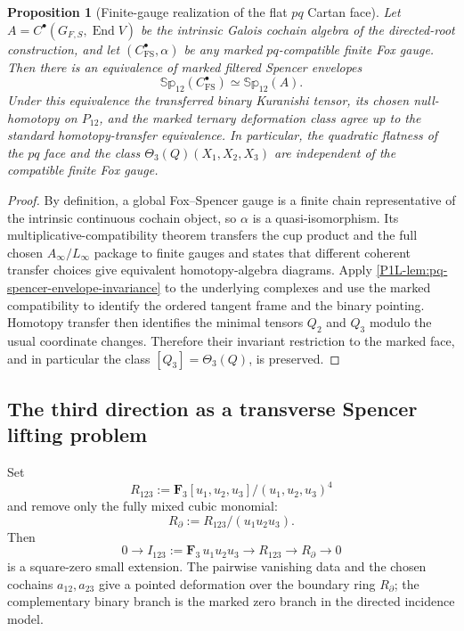 \documentclass[11pt]{article}
\newtheorem{proposition}[theorem]{Proposition}
\theoremstyle{remark}
\newcommand{\F}{\mathbf F}
\begin{document}
\begin{proposition}[Finite-gauge realization of the flat $pq$ Cartan face]
\label{P1L-thm:pq-finite-gauge-comparison}
Let $A=C^\bullet(G_{F,S},\operatorname{End}V)$ be the intrinsic Galois cochain
algebra of the directed-root construction, and let
$(C^\bullet_{\mathrm{FS}},\alpha)$ be any marked $pq$-compatible finite Fox
gauge.  Then there is an equivalence of marked filtered Spencer envelopes
\[
 \boxed{
 \mathbb{Sp}_{12}(C^\bullet_{\mathrm{FS}})
 \simeq
 \mathbb{Sp}_{12}(A).}
\]
Under this equivalence the transferred binary Kuranishi tensor, its chosen
null-homotopy on $P_{12}$, and the marked ternary deformation class agree up to
the standard homotopy-transfer equivalence.  In particular, the quadratic
flatness of the $pq$ face and the class
$\Theta_3(Q)(X_1,X_2,X_3)$ are independent of the compatible finite Fox gauge.
\end{proposition}

\begin{proof}
By definition, a global Fox--Spencer gauge is a finite chain representative
of the intrinsic continuous cochain object, so
$\alpha$ is a quasi-isomorphism.  Its multiplicative-compatibility theorem
transfers the cup product and the full chosen $A_\infty/L_\infty$ package to
finite gauges and states that different coherent transfer choices give
equivalent homotopy-algebra diagrams.  Apply
\cref{P1L-lem:pq-spencer-envelope-invariance} to the underlying complexes and use
the marked compatibility to identify the ordered tangent frame and the binary
pointing.  Homotopy transfer then identifies the minimal tensors $Q_2$ and
$Q_3$ modulo the usual coordinate changes.  Therefore their invariant
restriction to the marked face, and in particular the class
$[Q_3]=\Theta_3(Q)$, is preserved.
\end{proof}


\subsection{The third direction as a transverse Spencer lifting problem}

Set
\[
 R_{123}
 :=\F_3[u_1,u_2,u_3]/(u_1,u_2,u_3)^4
\]
and remove only the fully mixed cubic monomial:
\[
 R_{\partial}
 :=R_{123}/(u_1u_2u_3).
\]
Then
\[
 0\longrightarrow
 I_{123}:=\F_3\,u_1u_2u_3
 \longrightarrow R_{123}\longrightarrow R_{\partial}
 \longrightarrow0
\]
is a square-zero small extension.  The pairwise vanishing data and the chosen
cochains \(a_{12},a_{23}\) give a pointed deformation over the boundary ring
\(R_{\partial}\); the complementary binary branch is the marked zero branch
in the directed incidence model.
\end{document}
